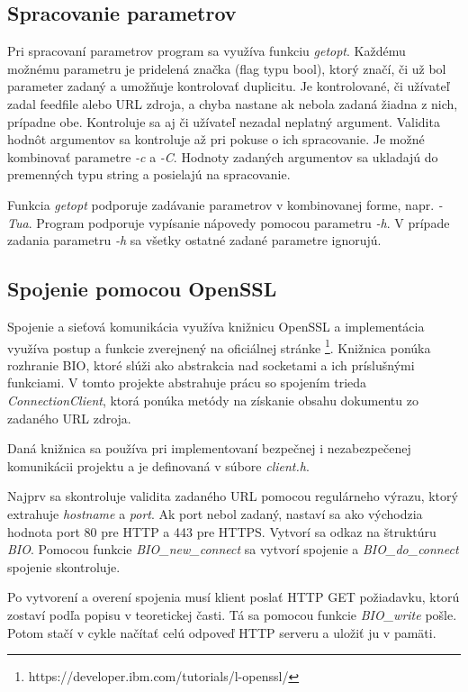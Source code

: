 \documentclass[11pt,a4paper]{article}
\begin{document}
\subsection{Spracovanie parametrov}

Pri spracovaní parametrov program sa využíva funkciu \textit{getopt}.
Každému možnému parametru je pridelená značka (flag typu bool), ktorý značí, či už bol parameter zadaný a umožňuje kontrolovať duplicitu.
Je kontrolované, či užívateľ zadal feedfile alebo URL zdroja, a chyba nastane ak nebola zadaná žiadna z nich, prípadne obe. Kontroluje sa aj či užívateľ nezadal neplatný argument. Validita hodnôt argumentov sa kontroluje až pri pokuse o ich spracovanie. Je možné kombinovať parametre \textit{-c} a \textit{-C}. Hodnoty zadaných argumentov sa ukladajú do premenných typu string a posielajú na spracovanie.

Funkcia \textit{getopt} podporuje zadávanie parametrov v kombinovanej forme, napr. \textit{-Tua}. Program podporuje vypísanie nápovedy pomocou parametru \textit{-h}. V prípade zadania parametru \textit{-h} sa všetky ostatné zadané parametre ignorujú.

\subsection{Spojenie pomocou OpenSSL}

Spojenie a sieťová komunikácia využíva knižnicu OpenSSL a implementácia využíva postup a funkcie zverejnený na oficiálnej stránke \footnote{https://developer.ibm.com/tutorials/l-openssl/}. Knižnica ponúka rozhranie BIO, ktoré slúži ako abstrakcia nad socketami a ich príslušnými funkciami.
V tomto projekte abstrahuje prácu so spojením trieda \textit{ConnectionClient}, ktorá ponúka metódy na získanie obsahu dokumentu zo zadaného URL zdroja.

Daná knižnica sa používa pri implementovaní bezpečnej i nezabezpečenej komunikácii projektu a je definovaná v súbore \textit{client.h}.

Najprv sa skontroluje validita zadaného URL pomocou regulárneho výrazu, ktorý extrahuje \textit{hostname} a \textit{port}. Ak port nebol zadaný, nastaví sa ako východzia hodnota port 80 pre HTTP a 443 pre HTTPS.
Vytvorí sa odkaz na štruktúru \textit{BIO}. Pomocou funkcie \textit{BIO\_new\_connect} sa vytvorí spojenie a \textit{BIO\_do\_connect} spojenie skontroluje. 

Po vytvorení a overení spojenia musí klient poslať HTTP GET požiadavku, ktorú zostaví podľa popisu v teoretickej časti. Tá sa pomocou funkcie \textit{BIO\_write} pošle. Potom stačí v cykle načítať celú odpoveď HTTP serveru a uložiť ju v pamäti.
\end{document}
